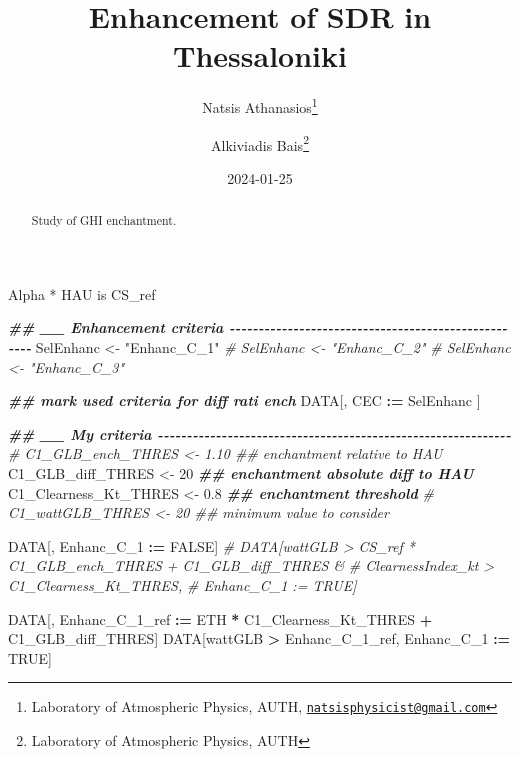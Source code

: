 \documentclass[
  10pt,
  a4paper,oneside]{article}
\title{Enhancement of SDR in Thessaloniki}
\author{Natsis Athanasios\footnote{Laboratory of Atmospheric Physics, AUTH, \href{mailto:natsisphysicist@gmail.com}{\nolinkurl{natsisphysicist@gmail.com}}} \and Alkiviadis Bais\footnote{Laboratory of Atmospheric Physics, AUTH}}
\date{2024-01-25}
\newenvironment{Shaded}{\begin{snugshade}}{\end{snugshade}}
\newcommand{\CommentTok}[1]{\textcolor[rgb]{0.56,0.35,0.01}{\textit{#1}}}
\newcommand{\ConstantTok}[1]{\textcolor[rgb]{0.56,0.35,0.01}{#1}}
\newcommand{\DecValTok}[1]{\textcolor[rgb]{0.00,0.00,0.81}{#1}}
\newcommand{\DocumentationTok}[1]{\textcolor[rgb]{0.56,0.35,0.01}{\textbf{\textit{#1}}}}
\newcommand{\FloatTok}[1]{\textcolor[rgb]{0.00,0.00,0.81}{#1}}
\newcommand{\NormalTok}[1]{#1}
\newcommand{\OtherTok}[1]{\textcolor[rgb]{0.56,0.35,0.01}{#1}}
\newcommand{\SpecialCharTok}[1]{\textcolor[rgb]{0.81,0.36,0.00}{\textbf{#1}}}
\newcommand{\StringTok}[1]{\textcolor[rgb]{0.31,0.60,0.02}{#1}}
\begin{document}
\maketitle
\begin{abstract}
Study of GHI enchantment.
\end{abstract}

{
\hypersetup{linkcolor=}
\setcounter{tocdepth}{4}
\tableofcontents
}
Alpha * HAU is CS\_ref

\begin{Shaded}
\begin{Highlighting}[]
\DocumentationTok{\#\# \_\_ Enhancement criteria  {-}{-}{-}{-}{-}{-}{-}{-}{-}{-}{-}{-}{-}{-}{-}{-}{-}{-}{-}{-}{-}{-}{-}{-}{-}{-}{-}{-}{-}{-}{-}{-}{-}{-}{-}{-}{-}{-}{-}{-}{-}{-}{-}{-}{-}{-}{-}{-}{-}{-}{-}{-}}
\NormalTok{SelEnhanc }\OtherTok{\textless{}{-}} \StringTok{"Enhanc\_C\_1"}
\CommentTok{\# SelEnhanc \textless{}{-} "Enhanc\_C\_2"}
\CommentTok{\# SelEnhanc \textless{}{-} "Enhanc\_C\_3"}

\DocumentationTok{\#\# mark used criteria for diff rati ench}
\NormalTok{DATA[, CEC }\SpecialCharTok{:=}\NormalTok{ SelEnhanc ]}

\DocumentationTok{\#\# \_\_ My criteria  {-}{-}{-}{-}{-}{-}{-}{-}{-}{-}{-}{-}{-}{-}{-}{-}{-}{-}{-}{-}{-}{-}{-}{-}{-}{-}{-}{-}{-}{-}{-}{-}{-}{-}{-}{-}{-}{-}{-}{-}{-}{-}{-}{-}{-}{-}{-}{-}{-}{-}{-}{-}{-}{-}{-}{-}{-}{-}{-}{-}{-}}
\CommentTok{\# C1\_GLB\_ench\_THRES     \textless{}{-}  1.10 \#\# enchantment relative to HAU}
\NormalTok{C1\_GLB\_diff\_THRES     }\OtherTok{\textless{}{-}} \DecValTok{20}    \DocumentationTok{\#\# enchantment absolute diff to HAU}
\NormalTok{C1\_Clearness\_Kt\_THRES }\OtherTok{\textless{}{-}}  \FloatTok{0.8}  \DocumentationTok{\#\# enchantment threshold}
\CommentTok{\# C1\_wattGLB\_THRES      \textless{}{-} 20    \#\# minimum value to consider}

\NormalTok{DATA[, Enhanc\_C\_1 }\SpecialCharTok{:=} \ConstantTok{FALSE}\NormalTok{]}
\CommentTok{\# DATA[wattGLB           \textgreater{} CS\_ref * C1\_GLB\_ench\_THRES + C1\_GLB\_diff\_THRES \&}
\CommentTok{\#      ClearnessIndex\_kt \textgreater{} C1\_Clearness\_Kt\_THRES,}
\CommentTok{\#      Enhanc\_C\_1 := TRUE]}

\NormalTok{DATA[, Enhanc\_C\_1\_ref }\SpecialCharTok{:=}\NormalTok{ ETH }\SpecialCharTok{*}\NormalTok{ C1\_Clearness\_Kt\_THRES }\SpecialCharTok{+}\NormalTok{ C1\_GLB\_diff\_THRES]}
\NormalTok{DATA[wattGLB }\SpecialCharTok{\textgreater{}}\NormalTok{ Enhanc\_C\_1\_ref,}
\NormalTok{     Enhanc\_C\_1 }\SpecialCharTok{:=} \ConstantTok{TRUE}\NormalTok{]}


\end{Highlighting}
\end{Shaded}
\end{document}
